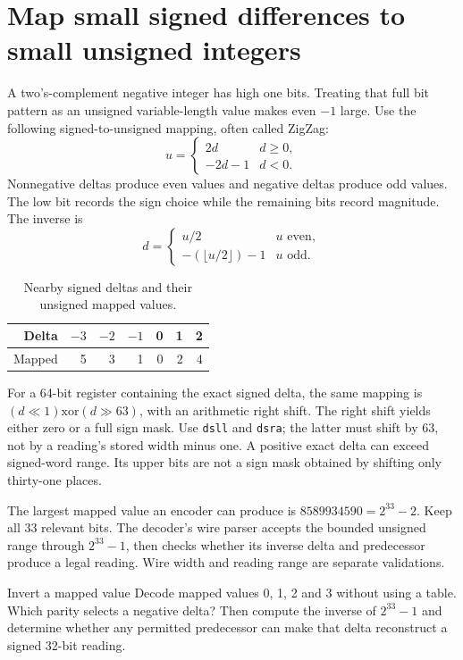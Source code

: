 \section{Map small signed differences to small unsigned integers}
A two's-complement negative integer has high one bits. Treating that full bit pattern
as an unsigned variable-length value makes even \(-1\) large. Use the following
signed-to-unsigned mapping, often called ZigZag:
\[
 u=\begin{cases}2d&d\geq0,\\-2d-1&d<0.\end{cases}
\]
Nonnegative deltas produce even values and negative deltas produce odd values.
The low bit records the sign choice while the remaining bits record magnitude.
The inverse is
\[
 d=\begin{cases}u/2&u\text{ even},\\-(\lfloor u/2\rfloor)-1&u\text{ odd}.\end{cases}
\]

\begin{table}[htbp]
\centering
\caption{Nearby signed deltas and their unsigned mapped values.}
\begin{tabular}{rrrrrrr}
\toprule
Delta & \(-3\) & \(-2\) & \(-1\) & 0 & 1 & 2\\
\midrule
Mapped & 5 & 3 & 1 & 0 & 2 & 4\\
\bottomrule
\end{tabular}
\end{table}

For a 64-bit register containing the exact signed delta, the same mapping is
\((d\ll1)\mathbin{\mathrm{xor}}(d\gg63)\), with an arithmetic right shift.
The right shift yields either zero or a full sign mask. Use \texttt{dsll} and
\texttt{dsra}; the latter must shift by 63, not by a reading's stored width minus
one. A positive exact delta can exceed signed-word range. Its upper bits are not a
sign mask obtained by shifting only thirty-one places.

The largest mapped value an encoder can produce is \(8589934590=2^{33}-2\).
Keep all 33 relevant bits. The decoder's wire parser accepts the bounded unsigned
range through \(2^{33}-1\), then checks whether its inverse delta and predecessor
produce a legal reading. Wire width and reading range are separate validations.

\begin{MARSExercise}{Invert a mapped value}
Decode mapped values 0, 1, 2 and 3 without using a table. Which parity selects a
negative delta? Then compute the inverse of \(2^{33}-1\) and determine whether any
permitted predecessor can make that delta reconstruct a signed 32-bit reading.
\end{MARSExercise}
